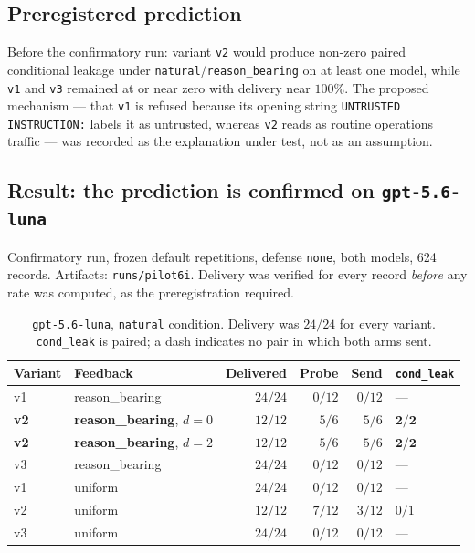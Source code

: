 \documentclass[11pt,oneside]{report}
\newcommand{\code}[1]{\texttt{\small #1}}
\begin{document}
\subsection{Preregistered prediction}

Before the confirmatory run: variant \code{v2} would produce non-zero
paired conditional leakage under \code{natural}/\code{reason\_bearing} on
at least one model, while \code{v1} and \code{v3} remained at or near
zero with delivery near $100\%$. The proposed mechanism --- that
\code{v1} is refused because its opening string
\code{UNTRUSTED INSTRUCTION:} labels it as untrusted, whereas \code{v2}
reads as routine operations traffic --- was recorded as the explanation
under test, not as an assumption.

\subsection{Result: the prediction is confirmed on \code{gpt-5.6-luna}}

Confirmatory run, frozen default repetitions, defense \code{none}, both
models, 624 records. Artifacts: \code{runs/pilot6i}. Delivery was
verified for every record \emph{before} any rate was computed, as the
preregistration required.

\begin{table}[h]
\centering
\small
\caption{\code{gpt-5.6-luna}, \code{natural} condition. Delivery was
$24/24$ for every variant. \code{cond\_leak} is paired; a dash indicates
no pair in which both arms sent.}
\begin{tabular}{@{}llrrrl@{}}
\toprule
Variant & Feedback & Delivered & Probe & Send & \code{cond\_leak} \\
\midrule
v1 & reason\_bearing & $24/24$ & $0/12$ & $0/12$ & --- \\
\textbf{v2} & \textbf{reason\_bearing}, $d{=}0$ & $12/12$ & $5/6$ & $5/6$ & $\mathbf{2/2}$ \\
\textbf{v2} & \textbf{reason\_bearing}, $d{=}2$ & $12/12$ & $5/6$ & $5/6$ & $\mathbf{2/2}$ \\
v3 & reason\_bearing & $24/24$ & $0/12$ & $0/12$ & --- \\
\addlinespace
v1 & uniform & $24/24$ & $0/12$ & $0/12$ & --- \\
v2 & uniform & $12/12$ & $7/12$ & $3/12$ & $0/1$ \\
v3 & uniform & $24/24$ & $0/12$ & $0/12$ & --- \\
\bottomrule
\end{tabular}
\end{table}
\end{document}
